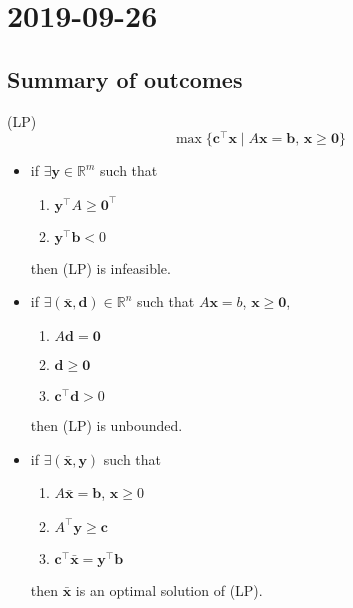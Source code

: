 \section{2019-09-26}
\subsection{Summary of outcomes}
(LP)
\[\max \{\mathbf{c}^\top \mathbf{x} \mid A\mathbf{x}=\mathbf{b}\text{, }
\mathbf{x}\ge\mathbf{0}\}\]
\begin{itemize}
    \item if $\exists \mathbf{y}\in\mathbb{R}^m$ such that
    \begin{enumerate}[(1)]
        \item $\mathbf{y}^\top A\ge\mathbf{0}^\top $
        \item $\mathbf{y}^\top \mathbf{b}<0$
    \end{enumerate}
    then (LP) is infeasible.
    \item if $\exists(\bar{\mathbf{x}}, \mathbf{d})\in\mathbb{R}^n$ such that $A\mathbf{x}=b$, $\mathbf{x}\ge \mathbf{0}$, 
    \begin{enumerate}[(1)]
        \item $A\mathbf{d}=\mathbf{0}$
        \item $\mathbf{d}\ge \mathbf{0}$
        \item $\mathbf{c}^\top \mathbf{d}>0$
    \end{enumerate}
    then (LP) is unbounded.
    \item if $\exists(\mathbf{\bar{x}},\mathbf{y})$ such that
    \begin{enumerate}[(1)]
        \item $A\mathbf{\bar{x}}=\mathbf{b}$, $\mathbf{x}\ge 0$
        \item $A^\top \mathbf{y}\ge\mathbf{c}$
        \item $\mathbf{c}^\top  \mathbf{\bar{x}}=\mathbf{y}^\top \mathbf{b}$
    \end{enumerate}
    then $\mathbf{\bar{x}}$ is an optimal solution of (LP).
\end{itemize}

